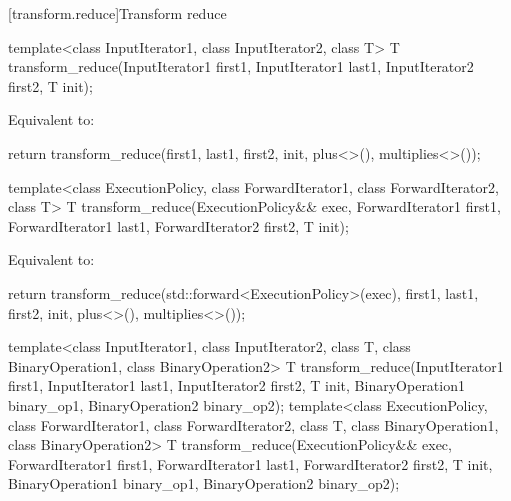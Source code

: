 [transform.reduce]{Transform reduce}
%
\begin{itemdecl}
template<class InputIterator1, class InputIterator2, class T>
  T transform_reduce(InputIterator1 first1, InputIterator1 last1,
                     InputIterator2 first2,
                     T init);
\end{itemdecl}

\begin{itemdescr}
\pnum
\effects
Equivalent to:
\begin{codeblock}
return transform_reduce(first1, last1, first2, init, plus<>(), multiplies<>());
\end{codeblock}
\end{itemdescr}

%
\begin{itemdecl}
template<class ExecutionPolicy,
         class ForwardIterator1, class ForwardIterator2, class T>
  T transform_reduce(ExecutionPolicy&& exec,
                     ForwardIterator1 first1, ForwardIterator1 last1,
                     ForwardIterator2 first2,
                     T init);
\end{itemdecl}

\begin{itemdescr}
\pnum
\effects
Equivalent to:
\begin{codeblock}
return transform_reduce(std::forward<ExecutionPolicy>(exec),
                        first1, last1, first2, init, plus<>(), multiplies<>());
\end{codeblock}
\end{itemdescr}

%
\begin{itemdecl}
template<class InputIterator1, class InputIterator2, class T,
         class BinaryOperation1, class BinaryOperation2>
  T transform_reduce(InputIterator1 first1, InputIterator1 last1,
                     InputIterator2 first2,
                     T init,
                     BinaryOperation1 binary_op1,
                     BinaryOperation2 binary_op2);
template<class ExecutionPolicy,
         class ForwardIterator1, class ForwardIterator2, class T,
         class BinaryOperation1, class BinaryOperation2>
  T transform_reduce(ExecutionPolicy&& exec,
                     ForwardIterator1 first1, ForwardIterator1 last1,
                     ForwardIterator2 first2,
                     T init,
                     BinaryOperation1 binary_op1,
                     BinaryOperation2 binary_op2);
\end{itemdecl}

